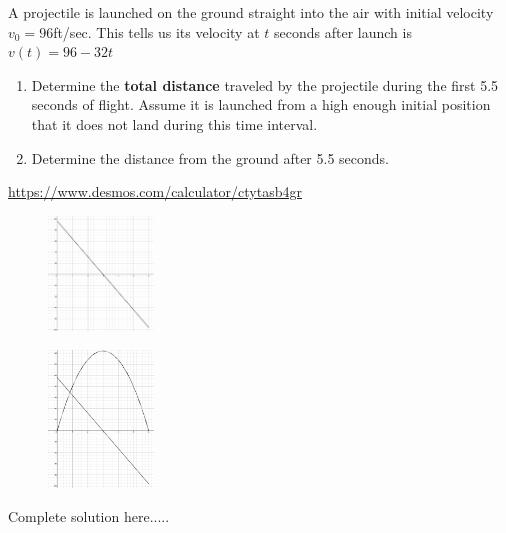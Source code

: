\begin{example}
A projectile is launched on the ground straight into the air with initial velocity $v_0=96$ft/sec. This tells us its velocity at $t$ seconds after launch is $v(t)=96-32t$
\renewcommand{\labelenumi}{\textbf{(\alph{enumi})}}
\begin{enumerate}[leftmargin=*]
\item Determine the \textbf{total distance} traveled by the projectile during the first 5.5 seconds of flight. Assume it is launched from a high enough initial position that it does not land during this time interval.
\item Determine the distance from the ground after 5.5 seconds.
\end{enumerate}
\url{https://www.desmos.com/calculator/ctytasb4gr}
\begin{figure}[h!]
        \includegraphics[width=0.25\textwidth,inner]{images/defIntgArea/areaProjectile1.png}
        \captionsetup{justification=justified, singlelinecheck=false}
        \label{fig:areaEx1}
\end{figure}
\begin{figure}[h!]
        \includegraphics[width=0.25\textwidth,inner]{images/defIntgArea/areaProjectile2.png}
        \captionsetup{justification=justified, singlelinecheck=false}
        \label{fig:areaEx1}
\end{figure}

    \begin{sol}
    
    \end{sol}
    \begin{solL}
    Complete solution here.....
    
    \end{solL}
    
\end{example}

